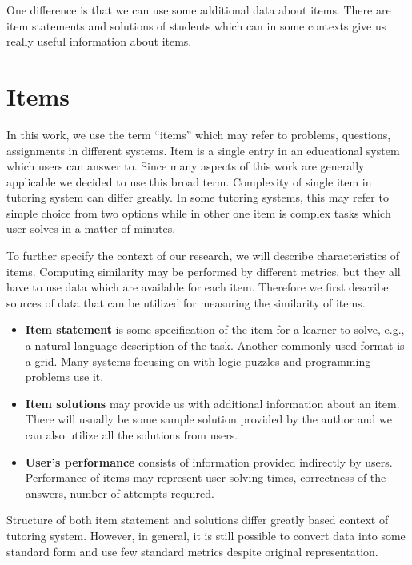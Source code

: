 \documentclass[
  digital, %
  table,   %
  nolof,     %
  nolot,     %
  nocover
]{fithesis3}
\begin{document}

One difference is that we can use some additional data about items. There are item statements and solutions of students which can in some contexts give us really useful information about items.

\section{Items}\label{items}



In this work, we use the term ``items'' which may refer to problems, questions, assignments in different systems. Item is a single entry in an educational system which
users can answer to. Since many aspects of this work are generally applicable we decided to use this broad term. Complexity of single item in tutoring system can differ greatly. In some tutoring systems, this may refer to simple choice from two options while in other one item is complex
tasks which user solves in a matter of minutes.


To further specify the context of our research, we will describe characteristics of items. Computing similarity may be performed by different metrics, but they all have to use data which are available for each item. Therefore we first describe sources of data that can be utilized for measuring the similarity of items.

\begin{itemize}
\item
  \textbf{Item statement} is some specification of the item for a learner to solve, e.g., a natural language description of the task. Another commonly used format is a grid. Many systems focusing on with logic puzzles and programming problems use it.
\item
  \textbf{Item solutions} may provide us with additional information about an item. There will usually be some sample solution provided by the author and we can also utilize all the solutions from users.
\item
  \textbf{User's performance} consists of information provided indirectly by users. Performance of items may represent user solving times, correctness of the answers, number of attempts required.
\end{itemize}

Structure of both item statement and solutions differ greatly based context of tutoring system. However, in general, it is still possible to convert data into some standard form and use few standard metrics despite original representation.
\end{document}
